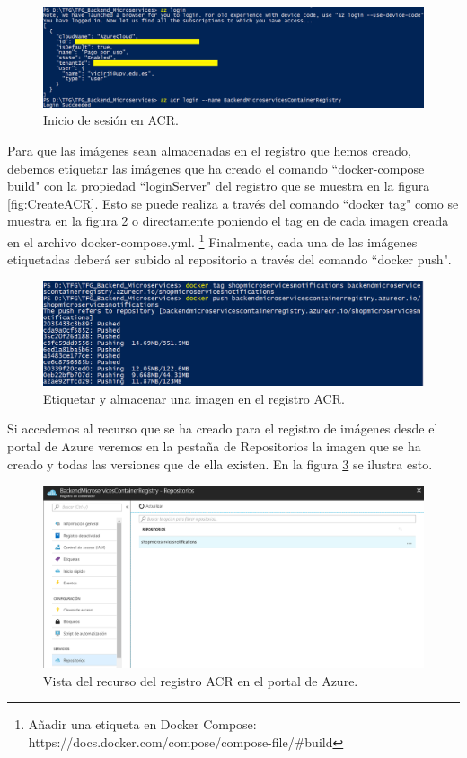 \documentclass[11pt,spanish,listoffigures]{tfgetsinf}
\begin{document}
\begin{figure}[h]
\centering
\includegraphics[scale=0.50]{LoginAcr}
\caption{Inicio de sesión en ACR.}
\label{fig:LoginAcr}
\end{figure}

Para que las imágenes sean almacenadas en el registro que hemos creado, debemos etiquetar las imágenes que ha creado el comando ``docker-compose build" con la propiedad ``loginServer" del registro que se muestra en la figura \ref{fig:CreateACR}. Esto se puede realiza a través del comando ``docker tag" como se muestra en la figura \ref{fig:PushImage} o directamente poniendo el tag en de cada imagen creada en el archivo docker-compose.yml. \footnote{ Añadir una etiqueta en Docker Compose: https://docs.docker.com/compose/compose-file/\#build} Finalmente, cada una de las imágenes etiquetadas deberá ser subido al repositorio a través del comando ``docker push".

\begin{figure}[h]
\centering
\includegraphics[scale=0.6]{PushImage}
\caption{Etiquetar y almacenar una imagen en el registro ACR.}
\label{fig:PushImage}
\end{figure}

Si accedemos al recurso que se ha creado para el registro de imágenes desde el portal de Azure veremos en la pestaña de Repositorios la imagen que se ha creado y todas las versiones que de ella existen. En la figura \ref{fig:RepositorioACR} se ilustra esto.

\begin{figure}[h]
\centering
\includegraphics[scale=0.5]{RepositorioACR}
\caption{Vista del recurso del registro ACR en el portal de Azure.}
\label{fig:RepositorioACR}
\end{figure}
\end{document}
